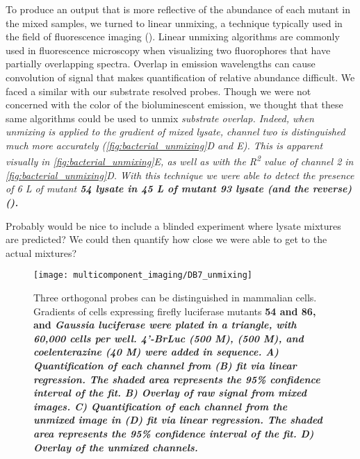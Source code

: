 

To produce an output that is more reflective of the abundance of each mutant in the mixed samples, we turned to linear unmixing, a technique typically used in the field of fluorescence imaging (). Linear unmixing algorithms are commonly used in fluorescence microscopy when visualizing two fluorophores that have partially overlapping spectra. Overlap in emission wavelengths can cause convolution of signal that makes quantification of relative abundance difficult. We faced a similar with our substrate resolved probes. Though we were not concerned with the color of the bioluminescent emission, we thought that these same algorithms could be used to unmix \it{substrate} overlap. Indeed, when unmixing is applied to the gradient of mixed lysate, channel two is distinguished much more accurately (\autoref{fig:bacterial_unmixing}D and E). This is apparent visually in \autoref{fig:bacterial_unmixing}E, as well as with the R\textsuperscript{2} value of channel 2 in \autoref{fig:bacterial_unmixing}D.
With this technique we were able to detect the presence of 6 \textmu{}L of mutant \bf{54} lysate in 45 \textmu{}L of mutant \bf{93} lysate (and the reverse) ().

\begin{thoughts}
  Probably would be nice to include a blinded experiment where lysate mixtures are predicted? We could then quantify how close we were able to get to the actual mixtures?
\end{thoughts}

\begin{figure}[htbp]
\texttt{[image: multicomponent\_imaging/DB7\_unmixing]}
\centering
\caption[Orthogonal bioluminescent probes can be distinguished in mammalian cells]{
Three orthogonal probes can be distinguished in mammalian cells. Gradients of cells expressing firefly luciferase mutants \bf{54} and \bf{86}, and \it{Gaussia} luciferase were plated in a triangle, with 60,000 cells per well. \bf{4'-BrLuc} (500 \textmu{}M), \dluciferin{} (500 \textmu{}M), and coelenterazine (40 \textmu{}M) were added in sequence. \bf{A)} Quantification of each channel from (B) fit via linear regression. The shaded area represents the 95\% confidence interval of the fit. \bf{B)} Overlay of raw signal from mixed images. \bf{C)} Quantification of each channel from the unmixed image in (D) fit via linear regression. The shaded area represents the 95\% confidence interval of the fit. \bf{D)} Overlay of the unmixed channels.
}
  \label{fig:DB7_unmixing}
\end{figure}

